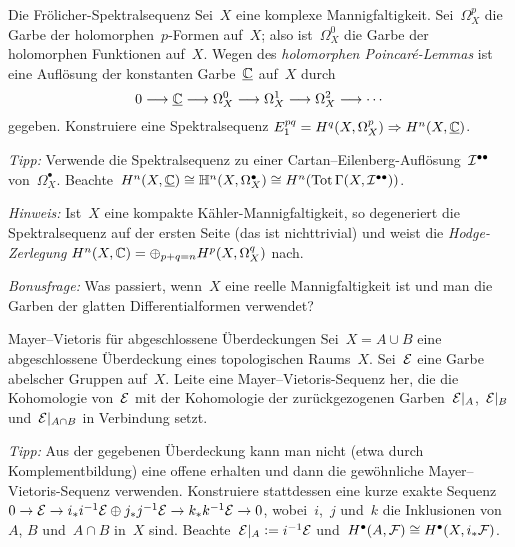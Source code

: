 \documentclass{uebblatt}
\begin{document}
\begin{aufgabe}{Die Frölicher-Spektralsequenz}
Sei~$X$ eine komplexe Mannigfaltigkeit. Sei~$\Omega_X^p$ die Garbe der
holomorphen~$p$-Formen auf~$X$; also ist~$\Omega_X^0$ die Garbe der holomorphen
Funktionen auf~$X$. Wegen des \emph{holomorphen Poincaré-Lemmas} ist eine
Auflösung der konstanten Garbe~$\underline{\mathbb{C}}$ auf~$X$ durch
\[ 0 \longrightarrow \underline{\mathbb{C}} \longrightarrow \Omega_X^0 \longrightarrow \Omega_X^1 \longrightarrow \Omega_X^2 \longrightarrow \cdots \]
gegeben. Konstruiere eine Spektralsequenz $E_1^{pq} = H^q(X,\Omega_X^p)
\Rightarrow H^n(X,\underline{\mathbb{C}})$.

{\tiny\emph{Tipp:} Verwende die Spektralsequenz zu einer
Cartan--Eilenberg-Auflösung~$\mathcal{I}^{\bullet\bullet}$ von~$\Omega_X^\bullet$.
Beachte~$H^n(X,\underline{\mathbb{C}}) \cong \mathbb{H}^n(X,\Omega_X^\bullet) \cong
H^n(\operatorname{Tot} \Gamma(X,\mathcal{I}^{\bullet\bullet}))$.\par}

{\tiny
\emph{Hinweis:} Ist~$X$ eine kompakte
Kähler-Mannig\-fal\-tig\-keit, so degeneriert die Spektralsequenz auf der ersten
Seite (das ist nichttrivial) und weist die \emph{Hodge-Zerlegung} $H^n(X,\mathbb{C}) = \oplus_{p+q=n}
H^p(X,\Omega_X^q)$ nach.\par}

{\tiny\emph{Bonusfrage:} Was passiert, wenn~$X$ eine reelle Mannigfaltigkeit
ist und man die Garben der glatten Differentialformen verwendet?\par}
\end{aufgabe}

\begin{aufgabe}{Mayer--Vietoris für abgeschlossene Überdeckungen}
Sei~$X = A \cup B$ eine abgeschlossene Überdeckung eines topologischen
Raums~$X$. Sei~$\mathcal{E}$ eine Garbe abelscher Gruppen auf~$X$. Leite eine
Mayer--Vietoris-Sequenz her, die die Kohomologie von~$\mathcal{E}$ mit der Kohomologie
der zurückgezogenen Garben~$\mathcal{E}|_A$,~$\mathcal{E}|_B$ und~$\mathcal{E}|_{A \cap B}$ in Verbindung
setzt.

{\tiny\emph{Tipp:} Aus der gegebenen Überdeckung kann man nicht (etwa durch
Komplementbildung) eine offene erhalten und dann die gewöhnliche
Mayer--Vietoris-Sequenz verwenden. Konstruiere stattdessen eine kurze exakte
Sequenz~$0 \to \mathcal{E} \to i_* i^{-1} \mathcal{E} \oplus j_* j^{-1} \mathcal{E} \to k_* k^{-1} \mathcal{E} \to
0$, wobei~$i$,~$j$ und~$k$ die Inklusionen von~$A$, $B$ und~$A \cap B$ in~$X$
sind. Beachte~$\mathcal{E}|_A \vcentcolon= i^{-1} \mathcal{E}$ und~$H^\bullet(A,\mathcal{F}) \cong
H^\bullet(X,i_*\mathcal{F})$.\par}
\end{aufgabe}
\end{document}
